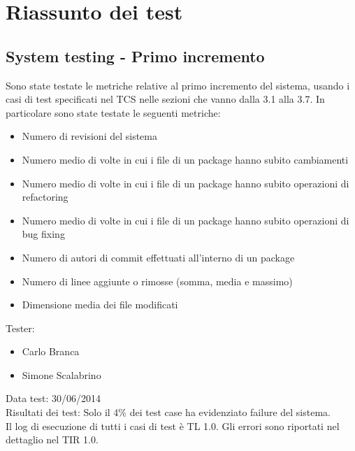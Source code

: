 \chapter{Riassunto dei test}

\section{System testing - Primo incremento}
Sono state testate le metriche relative al primo incremento del sistema, usando i casi di test specificati nel TCS nelle sezioni che vanno dalla 3.1 alla 3.7. In particolare sono state testate le seguenti metriche:
\begin{itemize}
 \item Numero di revisioni del sistema
 \item Numero medio di volte in cui i file di un package hanno subito cambiamenti
 \item Numero medio di volte in cui i file di un package hanno subito operazioni di refactoring
 \item Numero medio di volte in cui i file di un package hanno subito operazioni di bug fixing
 \item Numero di autori di commit effettuati all’interno di un package
 \item Numero di linee aggiunte o rimosse (somma, media e massimo)
 \item Dimensione media dei file modificati
\end{itemize}
\vspace{0.5cm}
Tester:
\begin{itemize}
\item Carlo Branca
\item Simone Scalabrino
\end{itemize}
Data test: 30/06/2014\\
Risultati dei test: Solo il 4\% dei test case ha evidenziato failure del sistema.\\
Il log di esecuzione di tutti i casi di test è TL 1.0. Gli errori sono riportati nel dettaglio nel TIR 1.0.


